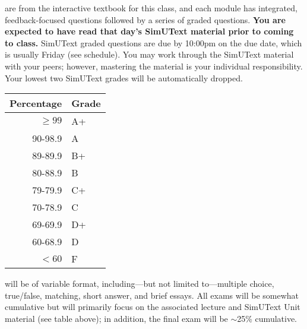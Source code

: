 \documentclass{tufte-handout}
\begin{document}
 are from the interactive textbook for this class, and each module has integrated, feedback-focused questions followed by a series of graded questions. \textbf{You are expected to have read that day's SimUText material prior to coming to class. } SimUText graded questions are due by 10:00pm on the due date, which is usually Friday (see schedule). You may work through the SimUText material with your peers; however, mastering the material is your individual responsibility. Your lowest two SimUText grades will be automatically dropped.


\begin{margintable}
\begin{tabular}{rl}
Percentage & Grade \\
\hline 
$\ge99$ & A+ \\
90-98.9 & A \\
89-89.9 & B+ \\
80-88.9 & B \\
79-79.9 & C+ \\
70-78.9 & C \\
69-69.9 & D+ \\
60-68.9 & D \\
$<60$ & F \\
\hline
\end{tabular}
\end{margintable}

 will be of variable format, including---but not limited to---multiple choice, true/false, matching, short answer, and brief essays. All exams will be somewhat cumulative but will primarily focus on the associated lecture and SimUText Unit material (see table above); in addition, the final exam will be $\sim$25\% cumulative. 
\end{document}
